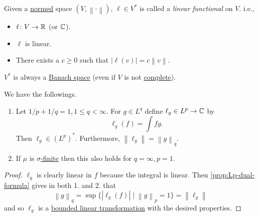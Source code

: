 \begin{definition}\label{def:linear-functional}
	Given a \hyperref[def:norm]{normed} space \((V, \left\lVert \cdot\right\rVert )\), \(\ell \in V^\ast\) is called a \emph{linear functional} on \(V\). i.e.,
	\begin{itemize}
		\item \(\ell \colon V \to \mathbb{\MakeUppercase{r}}\) (or \(\mathbb{\MakeUppercase{c}} \)).
		\item \(\ell \) is linear.
		\item There exists a \(c \geq 0\) such that \(\left\vert \ell(v) \right\vert  = c\left\lVert v\right\rVert\).
	\end{itemize}
\end{definition}

\begin{note}
	\(V^\ast\) is always a \hyperref[def:Banach-space]{Banach space} (even if \(V\) is not \hyperref[def:complete]{complete}).
\end{note}

\begin{corollary}\label{col:lp-lq-isometric}
	We have the followings.
	\begin{enumerate}
		\item Let \(1/p + 1/q = 1, 1 \leq q < \infty\). For \(g \in L^q\) define \(\ell_g \in L^p \to \mathbb{\MakeUppercase{c}}\) by
		      \[
			      \ell_g(f) = \int fg.
		      \]
		      Then \(\ell_g \in (L^p)^\ast\). Furthermore, \(\left\lVert \ell_g\right\rVert = \left\lVert g\right\rVert_q\).
		\item If \(\mu\) is \hyperref[def:finite-measure]{\(\sigma \)-finite} then this also holds for \(q = \infty, p = 1\).
	\end{enumerate}
\end{corollary}
\begin{proof}
	\(\ell_g\) is clearly linear in \(f\) because the integral is linear. Then \autoref{prop:Lp-dual-formula} gives in both 1. and 2. that
	\[
		\left\lVert g\right\rVert_q = \sup\{\left\vert \ell_g(f) \right\vert  \mid \left\lVert g\right\rVert _p = 1 \} = \left\lVert \ell_g\right\rVert
	\]
	and so \(\ell_g\) is a \hyperref[def:bounded-linear-transformation]{bounded linear transformation} with the desired properties.
\end{proof}

